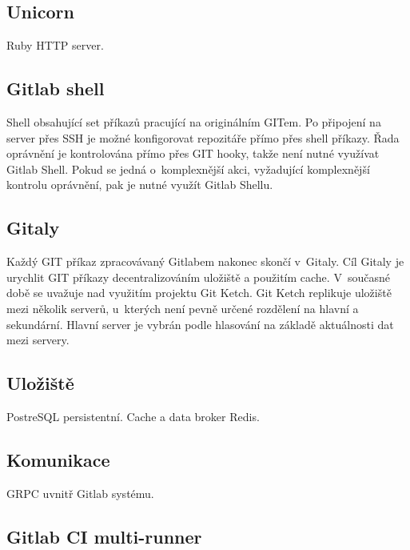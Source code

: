 \subsection{Unicorn}

Ruby HTTP server.


\subsection{Gitlab shell}

Shell obsahující set příkazů pracující na originálním GITem.
Po připojení na server přes SSH je možné konfigorovat repozitáře přímo přes shell příkazy.
Řada oprávnění je kontrolována přímo přes GIT hooky, takže není nutné využívat Gitlab Shell.
Pokud se jedná o~komplexnější akci, vyžadující komplexnější kontrolu oprávnění, pak je nutné využít Gitlab Shellu.


\subsection{Gitaly}

Každý GIT příkaz zpracovávaný Gitlabem nakonec skončí v~Gitaly.
Cíl Gitaly je urychlit GIT příkazy decentralizováním uložiště a použitím cache.
V~současné době se uvažuje nad využitím projektu Git Ketch.
Git Ketch replikuje uložiště mezi několik serverů, u~kterých není pevně určené rozdělení na hlavní a sekundární.
Hlavní server je vybrán podle hlasování na základě aktuálnosti dat mezi servery.


\subsection{Uložiště}

PostreSQL persistentní.
Cache a data broker Redis.

\subsection{Komunikace}

GRPC uvnitř Gitlab systému.




\subsection{Gitlab CI multi-runner}

